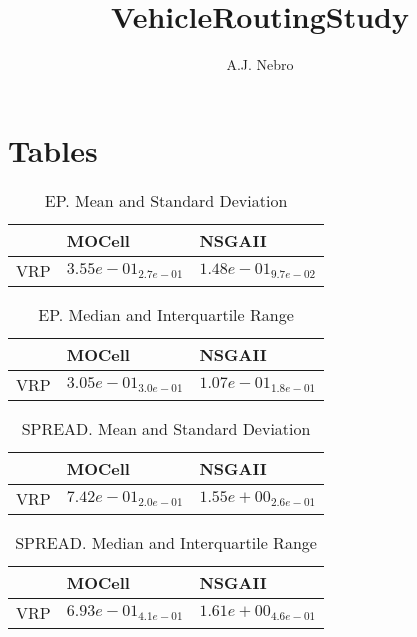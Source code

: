 \documentclass{article}
\title{VehicleRoutingStudy}
\author{A.J. Nebro}
\begin{document}
\maketitle
\section{Tables}

\begin{table}
\caption{EP. Mean and Standard Deviation}
\label{table: EP}
\centering
\begin{scriptsize}
\begin{tabular}{lll}
\hline & MOCell &  NSGAII\\
\hline 
VRP & \cellcolor{gray25}$  3.55e-01_{ 2.7e-01}$ & \cellcolor{gray95}$  1.48e-01_{ 9.7e-02}$ \\
\hline
\end{tabular}
\end{scriptsize}
\end{table}

\begin{table}
\caption{EP. Median and Interquartile Range}
\label{table: EP}
\centering
\begin{scriptsize}
\begin{tabular}{lll}
\hline & MOCell &  NSGAII\\
\hline 
VRP & \cellcolor{gray25}$  3.05e-01_{ 3.0e-01}$ & \cellcolor{gray95}$  1.07e-01_{ 1.8e-01}$ \\
\hline
\end{tabular}
\end{scriptsize}
\end{table}

\begin{table}
\caption{SPREAD. Mean and Standard Deviation}
\label{table: SPREAD}
\centering
\begin{scriptsize}
\begin{tabular}{lll}
\hline & MOCell &  NSGAII\\
\hline 
VRP & \cellcolor{gray95}$  7.42e-01_{ 2.0e-01}$ & \cellcolor{gray25}$  1.55e+00_{ 2.6e-01}$ \\
\hline
\end{tabular}
\end{scriptsize}
\end{table}

\begin{table}
\caption{SPREAD. Median and Interquartile Range}
\label{table: SPREAD}
\centering
\begin{scriptsize}
\begin{tabular}{lll}
\hline & MOCell &  NSGAII\\
\hline 
VRP & \cellcolor{gray95}$  6.93e-01_{ 4.1e-01}$ & \cellcolor{gray25}$  1.61e+00_{ 4.6e-01}$ \\
\hline
\end{tabular}
\end{scriptsize}
\end{table}
\end{document}
